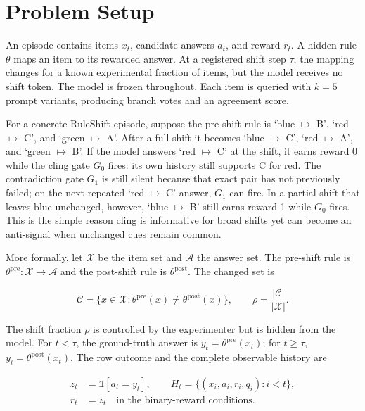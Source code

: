 \documentclass[pdflatex,sn-basic]{sn-jnl}
\theoremstyle{definition}
\newcommand{\ind}[1]{\mathbb{1}\!\left[#1\right]}
\newenvironment{eqbox}%
{\par\vspace{9pt}\noindent\begin{lrbox}{\eqsavebox}\begin{minipage}{\dimexpr\linewidth-18pt}\boldmath}%
{\end{minipage}\end{lrbox}\setlength{\fboxsep}{8pt}\noindent\colorbox{eqgrey}{\usebox{\eqsavebox}}\par\vspace{7pt}}
\begin{document}
\section{Problem Setup}
\label{sec:setup}

An episode contains items $x_t$, candidate answers $a_t$, and reward $r_t$. A hidden rule
$\theta$ maps an item to its rewarded answer. At a registered shift step $\tau$, the mapping
changes for a known experimental fraction of items, but the model receives no shift token.
The model is frozen throughout. Each item is queried with $k=5$ prompt variants, producing
branch votes and an agreement score.

For a concrete RuleShift episode, suppose the pre-shift rule is
`blue $\mapsto$ B', `red $\mapsto$ C', and `green $\mapsto$ A'. After a full shift it becomes
`blue $\mapsto$ C', `red $\mapsto$ A', and `green $\mapsto$ B'. If the model answers
`red $\mapsto$ C' at the shift, it earns reward 0 while the cling gate $G_0$ fires: its
own history still supports C for red. The contradiction gate $G_1$ is still silent because
that exact pair has not previously failed; on the next repeated `red $\mapsto$ C' answer,
$G_1$ can fire. In a partial shift that leaves blue unchanged, however, `blue $\mapsto$ B'
still earns reward 1 while $G_0$ fires. This is the simple reason cling is informative for
broad shifts yet can become an anti-signal when unchanged cues remain common.

More formally, let $\mathcal{X}$ be the item set and $\mathcal{A}$ the answer set. The
pre-shift rule is $\theta^{\mathrm{pre}}:\mathcal{X}\rightarrow\mathcal{A}$ and the
post-shift rule is $\theta^{\mathrm{post}}$. The changed set is

\begin{eqbox}
\[
\mathcal{C}=\{x\in\mathcal{X}:\theta^{\mathrm{pre}}(x)\neq
\theta^{\mathrm{post}}(x)\},\qquad
\rho=\frac{|\mathcal{C}|}{|\mathcal{X}|}.
\]
\end{eqbox}

The shift fraction $\rho$ is controlled by the experimenter but is hidden from the model.
For $t<\tau$, the ground-truth answer is $y_t=\theta^{\mathrm{pre}}(x_t)$; for $t\geq\tau$,
$y_t=\theta^{\mathrm{post}}(x_t)$. The row outcome and the complete observable history are

\begin{eqbox}
\begin{align*}
z_t&=\ind{a_t=y_t},\qquad
H_t=\{(x_i,a_i,r_i,q_i):i<t\},\\[-2pt]
r_t&=z_t\quad\text{in the binary-reward conditions}.
\end{align*}
\end{eqbox}
\end{document}
